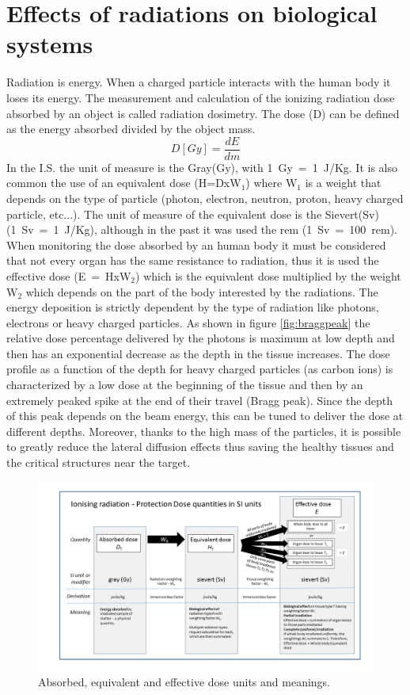 \section{Effects of radiations on biological systems}
Radiation is energy.
When a charged particle interacts with the human body it loses its energy.
The measurement and calculation of the ionizing radiation dose absorbed by an object is called radiation dosimetry.
\newline
The dose (D) can be defined as the energy absorbed divided by the object mass.
\begin{equation}\label{eq:dose}
	D\left[Gy \right] =\frac{dE}{dm}
\end{equation}
In the I.S. the unit of measure is the Gray(Gy), with 1~Gy~=~1~J/Kg.
\newline
It is also common the use of an equivalent dose (H=DxW$_1$) where W$_1$ is a weight that depends on the type of particle (photon, electron, neutron, proton, heavy charged particle, etc...). The unit of measure of the equivalent dose is the Sievert(Sv) (1~Sv~=~1~J/Kg), although in the past it was used the rem (1~Sv~=~100~rem).
\newline
When monitoring the dose absorbed by an human body it must be considered that not every organ has the same resistance to radiation, thus it is used the effective dose (E~=~HxW$_2$) which is the equivalent dose multiplied by the weight W$_2$ which depends on the part of the body interested by the radiations.
\newline
\noindent The energy deposition is strictly dependent by the type of radiation like photons, electrons or heavy charged particles. As shown in figure \ref{fig:braggpeak} the relative dose percentage delivered by the photons is maximum at low depth and then has an exponential decrease as the depth in the tissue increases.
The dose profile as a function of the depth for heavy charged particles (as carbon ions) is characterized by a low dose at the beginning of the tissue and then by an extremely peaked spike at the end of their travel (Bragg peak).
Since the depth of this peak depends on the beam energy, this can be tuned to deliver the dose at different depths.
Moreover, thanks to the high mass of the particles, it is possible to greatly reduce the lateral diffusion effects thus saving the healthy tissues and the critical structures near the target.
\begin{figure}[H]
	\centering
	\includegraphics[width=0.7\linewidth]{IMG/ch1/SIRadiationDoseUnits}
	\caption{Absorbed, equivalent and effective dose units and meanings.}
	\label{fig:SIRadiationDoseUnits}
\end{figure} 
